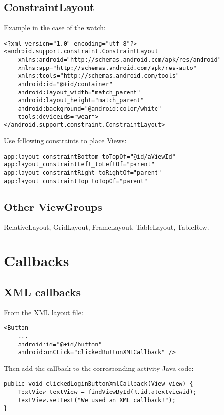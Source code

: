 \documentclass[11pt]{article}
\begin{document}
\subsection{ConstraintLayout}
Example in the case of the watch:
\lstset{language = XML}
\begin{lstlisting}
<?xml version="1.0" encoding="utf-8"?>
<android.support.constraint.ConstraintLayout
    xmlns:android="http://schemas.android.com/apk/res/android"
    xmlns:app="http://schemas.android.com/apk/res-auto"
    xmlns:tools="http://schemas.android.com/tools"
    android:id="@+id/container"
    android:layout_width="match_parent"
    android:layout_height="match_parent"
    android:background="@android:color/white"
    tools:deviceIds="wear">
</android.support.constraint.ConstraintLayout>
\end{lstlisting}
Use following constraints to place Views:
\lstset{language = XML}
\begin{lstlisting}
app:layout_constraintBottom_toTopOf="@id/aViewId"
app:layout_constraintLeft_toLeftOf="parent"
app:layout_constraintRight_toRightOf="parent"
app:layout_constraintTop_toTopOf="parent"
\end{lstlisting}

\subsection{Other ViewGroups}
RelativeLayout, GridLayout, FrameLayout, TableLayout, TableRow.

\section{Callbacks}
\subsection{XML callbacks}
From the XML layout file:
\begin{lstlisting}
<Button
    ...
    android:id="@+id/button"
    android:onCLick="clickedButtonXMLCallback" />
\end{lstlisting}
Then add the callback to the corresponding activity Java code:
\lstset{language = Java}
\begin{lstlisting}
public void clickedLoginButtonXmlCallback(View view) {
    TextView textView = findViewById(R.id.atextviewid);
    textView.setText("We used an XML callback!");
}
\end{lstlisting}
\end{document}
